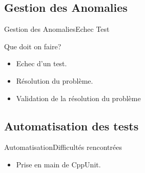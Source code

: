 	\subsection{Gestion des Anomalies}
		
		\begin{frame}{Gestion des Anomalies}{Echec Test}
			\begin{block}{Que doit on faire?}
				\begin{itemize}
					\item<1-> Echec d'un test.
					\item<2-> Résolution du problème.
					\item<3-> Validation de la résolution du problème
				\end{itemize} 
			\end{block}
		\end{frame}

	\subsection{Automatisation des tests}
		\begin{frame}{Automatisation}{Difficultés rencontrées}
			\begin{itemize}
				\item<1-> Prise en main de CppUnit.
			\end{itemize} 
		\end{frame}

